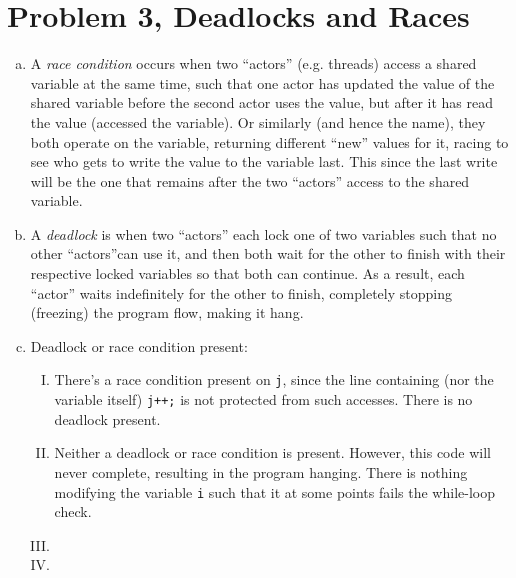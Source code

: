 \documentclass[fontsize=11pt, paper=a4, titlepage]{article}
\begin{document}
\section{Problem 3, Deadlocks and Races}
\begin{enumerate}[a)]

    \item A \textit{race condition} occurs when two ``actors'' (e.g. threads)
access a  shared variable at the same time, such that one actor has updated the
value of the shared variable before the second actor uses the value, but after
it has read the value (accessed the variable). Or similarly (and hence the
name), they both operate on the variable, returning different ``new'' values for
it, racing to see who gets to write the value to the variable last. This since
the last write will be the one that remains after the two ``actors'' access to
the shared variable.

    \item A \textit{deadlock} is when two ``actors'' each lock one of two
variables  such that no other ``actors''can use it, and then both wait for the
other to finish with their respective locked variables so that both can
continue. As a result, each ``actor'' waits indefinitely for the other to
finish, completely stopping (freezing) the program flow, making it hang.

    \item Deadlock or race condition present:
    \begin{enumerate}[I)]

        \item There's a race condition present on \lstinline!j!, since the line
containing (nor the variable itself) \lstinline!j++;! is not protected from such accesses. There is no deadlock present.

        \item Neither a deadlock or race condition is present. However, this
code will  never complete, resulting in the program hanging. There is nothing
modifying the variable \lstinline§i§ such that it at some points fails the
while-loop check.

        \item {}

        \item {}

    \end{enumerate}
\end{enumerate}
\end{document}
